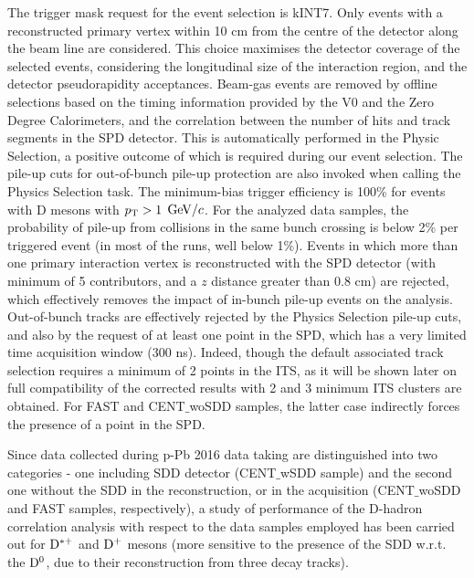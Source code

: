 The trigger mask request for the event selection is kINT7. Only events with a reconstructed primary vertex within 10 cm from the centre of the detector along the beam line are considered. This choice maximises the detector coverage of the selected events, considering the longitudinal size of the interaction region, and
the detector pseudorapidity acceptances. 
Beam-gas events are removed by offline selections based on the timing information provided by the V0 and the Zero Degree Calorimeters, and the correlation between the number of hits and track segments in the SPD detector. This is automatically performed in the Physic Selection, a positive outcome of which is required during our event selection. The pile-up cuts for out-of-bunch pile-up protection are also invoked when calling the Physics Selection task.
The minimum-bias trigger efficiency is 100\% for events with D mesons with $p_{\rm T} > 1$ $\mathrm{GeV}/c$. For the analyzed data samples, the probability of pile-up from collisions in the same bunch crossing is below 2\% per triggered event (in most of the runs, well below 1\%). Events in which more than one primary interaction vertex is reconstructed with the SPD detector (with minimum of 5 contributors, and a $z$ distance greater than 0.8 cm) are rejected, which effectively removes the impact of in-bunch pile-up events on the analysis. Out-of-bunch tracks are effectively rejected by the Physics Selection pile-up cuts, and also by the request of at least one point in the SPD, which has a very limited time acquisition window (300 ns). Indeed, though the default associated track selection requires a minimum of 2 points in the ITS, as it will be shown later on full compatibility of the corrected results with 2 and 3 minimum ITS clusters are obtained. For FAST and CENT$\_$woSDD samples, the latter case indirectly forces the presence of a point in the SPD.

Since data collected during p-Pb 2016 data taking are distinguished into two categories - one including SDD detector (CENT$\_$wSDD sample) and the second one without the SDD in the reconstruction, or in the acquisition (CENT$\_$woSDD and FAST samples, respectively), a study of performance of the D-hadron correlation analysis with respect to the data samples employed has been carried out for ${\rm D^{*+}}$ and ${\rm D^+}$ mesons (more sensitive to the presence of the SDD w.r.t. the ${\rm D^0}$, due to their reconstruction from three decay tracks).

